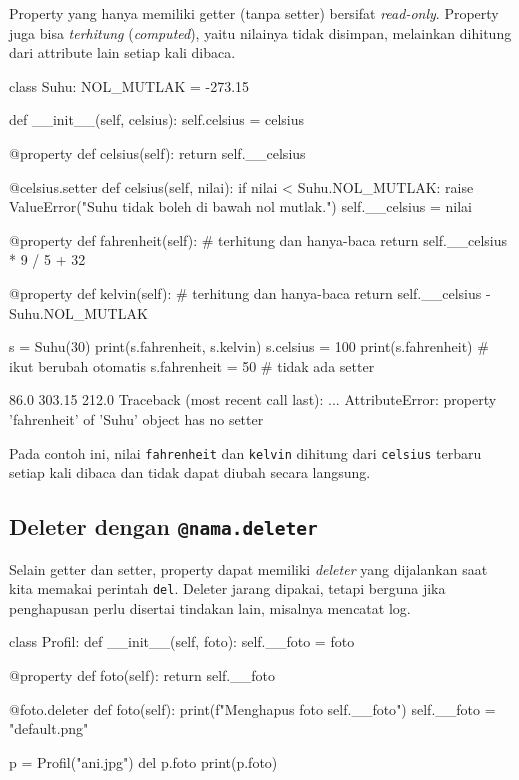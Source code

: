Property yang hanya memiliki getter (tanpa setter) bersifat \emph{read-only}. Property juga bisa \emph{terhitung} (\emph{computed}), yaitu nilainya tidak disimpan, melainkan dihitung dari attribute lain setiap kali dibaca.

\begin{kode}
class Suhu:
    NOL_MUTLAK = -273.15

    def __init__(self, celsius):
        self.celsius = celsius

    @property
    def celsius(self):
        return self.__celsius

    @celsius.setter
    def celsius(self, nilai):
        if nilai < Suhu.NOL_MUTLAK:
            raise ValueError("Suhu tidak boleh di bawah nol mutlak.")
        self.__celsius = nilai

    @property
    def fahrenheit(self):              # terhitung dan hanya-baca
        return self.__celsius * 9 / 5 + 32

    @property
    def kelvin(self):                  # terhitung dan hanya-baca
        return self.__celsius - Suhu.NOL_MUTLAK

s = Suhu(30)
print(s.fahrenheit, s.kelvin)
s.celsius = 100
print(s.fahrenheit)                    # ikut berubah otomatis
s.fahrenheit = 50                      # tidak ada setter
\end{kode}

\begin{keluaran}
86.0 303.15
212.0
Traceback (most recent call last):
  ...
AttributeError: property 'fahrenheit' of 'Suhu' object has no setter
\end{keluaran}

Pada contoh ini, nilai \texttt{fahrenheit} dan \texttt{kelvin} dihitung dari \texttt{celsius} terbaru setiap kali dibaca dan tidak dapat diubah secara langsung.

\subsection{Deleter dengan \texttt{@nama.deleter}}

Selain getter dan setter, property dapat memiliki \emph{deleter} yang dijalankan saat kita memakai perintah \texttt{del}. Deleter jarang dipakai, tetapi berguna jika penghapusan perlu disertai tindakan lain, misalnya mencatat log.

\begin{kode}[Deleter]
class Profil:
    def __init__(self, foto):
        self.__foto = foto

    @property
    def foto(self):
        return self.__foto

    @foto.deleter
    def foto(self):
        print(f"Menghapus foto {self.__foto}")
        self.__foto = "default.png"

p = Profil("ani.jpg")
del p.foto
print(p.foto)
\end{kode}

